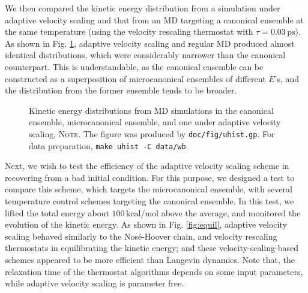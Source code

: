 \documentclass[preprint]{revtex4-1}
\newcommand{\note}[1]{{\color{DarkGreen}\footnotesize \textsc{Note.} #1}}
\begin{document}
We then compared the kinetic energy
distribution from a simulation under adaptive velocity scaling
and that from an MD targeting a canonical ensemble
at the same temperature
(using the velocity rescaling thermostat\cite{bussi2007} with $\tau = 0.03 \, \mathrm{ps}$).
%
As shown in Fig. \ref{fig:uhist},
adaptive velocity scaling and regular MD
produced almost identical distributions,
which were considerably narrower than
the canonical counterpart.
%
This is understandable,
as the canonical ensemble
can be constructed as a superposition
of microcanonical ensembles of different $E$'s,
and the distribution from the former ensemble
tends to be broader.
%
%

\begin{figure}[h]
\begin{center}
  \caption{
    \label{fig:uhist}
    Kinetic energy distributions
    from MD simulations in the canonical ensemble,
    microcanonical ensemble,
    and one under adaptive velocity scaling.
    \note{The figure was produced by \texttt{doc/fig/uhist.gp}.
      For data preparation, \texttt{make uhist -C data/wb}.
    }%
  }
\end{center}
\end{figure}


Next, we wish to test
the efficiency of the adaptive velocity scaling scheme
in recovering from a bad initial condition.
%
For this purpose,
we designed a test to compare this scheme,
which targets the microcanonical ensemble,
with several temperature control schemes
targeting the canonical ensemble.
%
In this test, we lifted the total energy about
$100\,\mathrm{kcal/mol}$ above the average,
and monitored the evolution of the kinetic energy.
%
As shown in Fig. \ref{fig:equil},
adaptive velocity scaling
behaved similarly to
the Nos\'e-Hoover chain\cite{nose1984, nose1984mp, hoover1985, martyna1992},
and velocity rescaling\cite{bussi2007}
thermostats
in equilibrating the kinetic energy;
and these velocity-scaling-based schemes
appeared to be more efficient than Langevin dynamics.
%
Note that, the relaxation time
of the thermostat algorithms
depends on some input parameters,
while adaptive velocity scaling
is parameter free.
\end{document}
